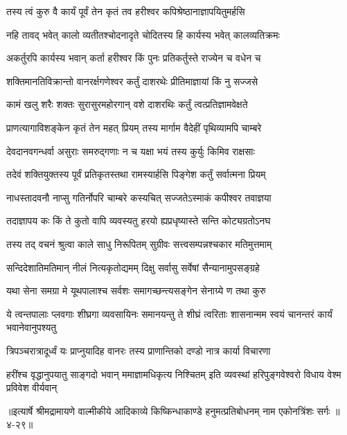 \twolineshloka
{तस्य त्वं कुरु वै कार्यं पूर्वं तेन कृतं तव}
{हरीश्वर कपिश्रेष्ठानाज्ञापयितुमर्हसि} %

\twolineshloka
{नहि तावद् भवेत् कालो व्यतीतश्चोदनादृते}
{चोदितस्य हि कार्यस्य भवेत् कालव्यतिक्रमः} %

\twolineshloka
{अकर्तुरपि कार्यस्य भवान् कर्ता हरीश्वर}
{किं पुनः प्रतिकर्तुस्ते राज्येन च वधेन च} %

\twolineshloka
{शक्तिमानतिविक्रान्तो वानरर्क्षगणेश्वर}
{कर्तुं दाशरथेः प्रीतिमाज्ञायां किं नु सज्जसे} %

\twolineshloka
{कामं खलु शरैः शक्तः सुरासुरमहोरगान्}
{वशे दाशरथिः कर्तुं त्वत्प्रतिज्ञामवेक्षते} %

\twolineshloka
{प्राणत्यागाविशङ्केन कृतं तेन महत् प्रियम्}
{तस्य मार्गाम वैदेहीं पृथिव्यामपि चाम्बरे} %

\twolineshloka
{देवदानवगन्धर्वा असुराः समरुद्गणाः}
{न च यक्षा भयं तस्य कुर्युः किमिव राक्षसाः} %

\twolineshloka
{तदेवं शक्तियुक्तस्य पूर्वं प्रतिकृतस्तथा}
{रामस्यार्हसि पिङ्गेश कर्तुं सर्वात्मना प्रियम्} %

\twolineshloka
{नाधस्तादवनौ नाप्सु गतिर्नोपरि चाम्बरे}
{कस्यचित् सज्जतेऽस्माकं कपीश्वर तवाज्ञया} %

\twolineshloka
{तदाज्ञापय कः किं ते कुतो वापि व्यवस्यतु}
{हरयो ह्यप्रधृष्यास्ते सन्ति कोट्यग्रतोऽनघ} %

\twolineshloka
{तस्य तद् वचनं श्रुत्वा काले साधु निरूपितम्}
{सुग्रीवः सत्त्वसम्पन्नश्चकार मतिमुत्तमाम्} %

\twolineshloka
{सन्दिदेशातिमतिमान् नीलं नित्यकृतोद्यमम्}
{दिक्षु सर्वासु सर्वेषां सैन्यानामुपसङ्ग्रहे} %

\twolineshloka
{यथा सेना समग्रा मे यूथपालाश्च सर्वशः}
{समागच्छन्त्यसङ्गेन सेनाग्र्ये ण तथा कुरु} %

\threelineshloka
{ये त्वन्तपालाः प्लवगाः शीघ्रगा व्यवसायिनः}
{समानयन्तु ते शीघ्रं त्वरिताः शासनान्मम}
{स्वयं चानन्तरं कार्यं भवानेवानुपश्यतु} %

\twolineshloka
{त्रिपञ्चरात्रादूर्ध्वं यः प्राप्नुयादिह वानरः}
{तस्य प्राणान्तिको दण्डो नात्र कार्या विचारणा} %

\twolineshloka
{हरींश्च वृद्धानुपयातु साङ्गदो भवान् ममाज्ञामधिकृत्य निश्चितम्}
{इति व्यवस्थां हरिपुङ्गवेश्वरो विधाय वेश्म प्रविवेश वीर्यवान्} %


॥इत्यार्षे श्रीमद्रामायणे वाल्मीकीये आदिकाव्ये किष्किन्धाकाण्डे हनुमत्प्रतिबोधनम् नाम एकोनत्रिंशः सर्गः ॥४-२९॥
